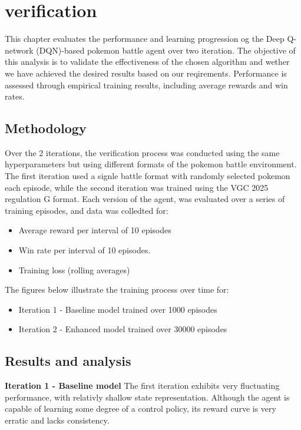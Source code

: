 \section{verification}
\label{sec:verification}

This chapter evaluates the performance and learning progression og the Deep Q-network 
(DQN)-based pokemon battle agent over two iteration. The objective of this analysis 
is to validate the effectiveness of the chosen algorithm and wether we have achieved
the desired results based on our reqirements. Performance is assessed through empirical
training results, including average rewards and win rates.  

\subsection{Methodology}
Over the 2 iterations, the verification process was conducted using the same hyperparameters
but using different formats of the pokemon battle environment.
The first iteration used a signle battle format with randomly selected pokemon each
episode, while the second iteration was trained using the VGC 2025 regulation G format.
Each version of the agent, was evaluated over a series of training episodes, and data 
was colledted for:
\begin{itemize}
    \item Average reward per interval of 10 episodes
    \item Win rate per interval of 10 episodes.
    \item Training loss (rolling averages)
\end{itemize}
The figures below illustrate the training process over time for:
\begin{itemize}
    \item Iteration 1 - Baseline model trained over 1000 episodes
    \item Iteration 2 - Enhanced model trained over 30000 episodes
\end{itemize}


\subsection{Results and analysis}
\textbf{Iteration 1 - Baseline model}
The first iteration exhibits very fluctuating performance, with relativly shallow 
state representation. Although the agent is capable of learning some degree of a control
policy, its reward curve is very erratic and lacks consistency.
